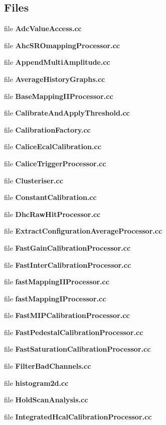 \subsection*{Files}
\begin{DoxyCompactItemize}
\item 
file {\bfseries Adc\-Value\-Access.\-cc}
\item 
file {\bfseries Ahc\-S\-R\-Omapping\-Processor.\-cc}
\item 
file {\bfseries Append\-Multi\-Amplitude.\-cc}
\item 
file {\bfseries Average\-History\-Graphs.\-cc}
\item 
file {\bfseries Base\-Mapping\-I\-I\-Processor.\-cc}
\item 
file {\bfseries Calibrate\-And\-Apply\-Threshold.\-cc}
\item 
file {\bfseries Calibration\-Factory.\-cc}
\item 
file {\bfseries Calice\-Ecal\-Calibration.\-cc}
\item 
file {\bfseries Calice\-Trigger\-Processor.\-cc}
\item 
file {\bfseries Clusteriser.\-cc}
\item 
file {\bfseries Constant\-Calibration.\-cc}
\item 
file {\bfseries Dhc\-Raw\-Hit\-Processor.\-cc}
\item 
file {\bfseries Extract\-Configuration\-Average\-Processor.\-cc}
\item 
file {\bfseries Fast\-Gain\-Calibration\-Processor.\-cc}
\item 
file {\bfseries Fast\-Inter\-Calibration\-Processor.\-cc}
\item 
file {\bfseries fast\-Mapping\-I\-I\-Processor.\-cc}
\item 
file {\bfseries fast\-Mapping\-I\-Processor.\-cc}
\item 
file {\bfseries Fast\-M\-I\-P\-Calibration\-Processor.\-cc}
\item 
file {\bfseries Fast\-Pedestal\-Calibration\-Processor.\-cc}
\item 
file {\bfseries Fast\-Saturation\-Calibration\-Processor.\-cc}
\item 
file {\bfseries Filter\-Bad\-Channels.\-cc}
\item 
file {\bfseries histogram2d.\-cc}
\item 
file {\bfseries Hold\-Scan\-Analysis.\-cc}
\item 
file {\bfseries Integrated\-Hcal\-Calibration\-Processor.\-cc}
\item 

\end{DoxyCompactItemize}

